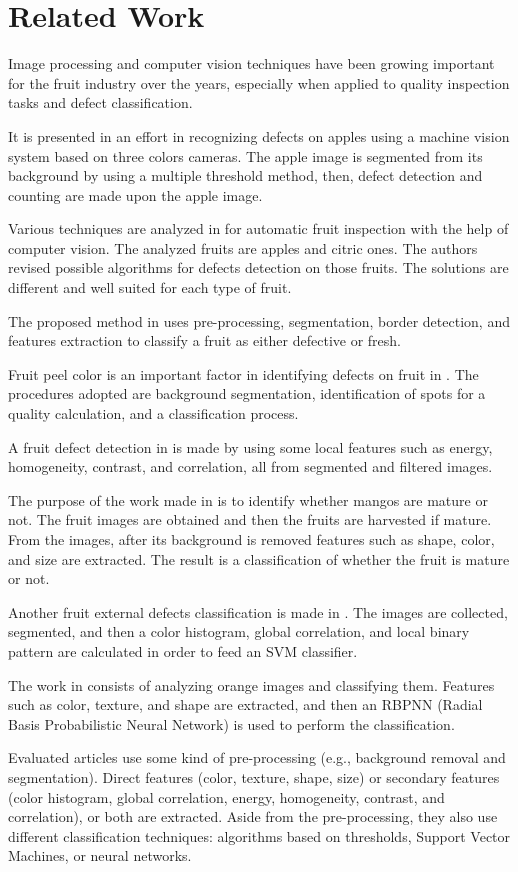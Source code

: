 \documentclass[../main.tex]{subfile}
\begin{document}
\section{Related Work} \label{sec:related-work}
Image processing and computer vision techniques have been growing important for the fruit industry over the years, especially when applied to quality inspection tasks and defect classification.

It is presented in \cite{II-item1} an effort in recognizing defects on apples using a machine vision system based on three colors cameras. The apple image is segmented from its background by using a multiple threshold method, then, defect detection and counting are made upon the apple image.

Various techniques are analyzed in \cite{II-item2} for automatic fruit inspection with the help of computer vision. The analyzed fruits are apples and citric ones. The authors revised possible algorithms for defects detection on those fruits. The solutions are different and well suited for each type of fruit.

The proposed method in \cite{II-item3} uses pre-processing, segmentation, border detection, and features extraction to classify a fruit as either defective or fresh.

Fruit peel color is an important factor in identifying defects on fruit in \cite{II-item4}. The procedures adopted are background segmentation, identification of spots for a quality calculation, and a classification process.

A fruit defect detection in \cite{II-item5} is made by using some local features such as energy, homogeneity, contrast, and correlation, all from segmented and filtered images.

The purpose of the work made in \cite{II-item6} is to identify whether mangos are mature or not. The fruit images are obtained and then the fruits are harvested if mature. From the images, after its background is removed features such as shape, color, and size are extracted. The result is a classification of whether the fruit is mature or not.

Another fruit external defects classification is made in \cite{II-item7}. The images are collected, segmented, and then a color histogram, global correlation, and local binary pattern are calculated in order to feed an SVM classifier.

The work in \cite{II-item8} consists of analyzing orange images and classifying them. Features such as color, texture, and shape are extracted, and then an RBPNN (Radial Basis Probabilistic Neural Network) is used to perform the classification.

Evaluated articles use some kind of pre-processing (e.g., background removal and segmentation). Direct features (color, texture, shape, size) or secondary features (color histogram, global correlation, energy, homogeneity, contrast, and correlation), or both are extracted. Aside from the pre-processing, they also use different classification techniques: algorithms based on thresholds, Support Vector Machines, or neural networks.
\end{document}
